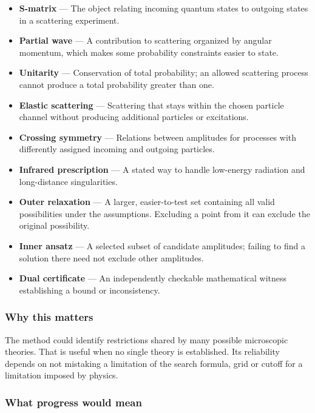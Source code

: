 \documentclass[
  11pt,
]{article}
\begin{document}
\begin{itemize}
\item
  \textbf{S-matrix} --- The object relating incoming quantum states to
  outgoing states in a scattering experiment.
\item
  \textbf{Partial wave} --- A contribution to scattering organized by
  angular momentum, which makes some probability constraints easier to
  state.
\item
  \textbf{Unitarity} --- Conservation of total probability; an allowed
  scattering process cannot produce a total probability greater than
  one.
\item
  \textbf{Elastic scattering} --- Scattering that stays within the
  chosen particle channel without producing additional particles or
  excitations.
\item
  \textbf{Crossing symmetry} --- Relations between amplitudes for
  processes with differently assigned incoming and outgoing particles.
\item
  \textbf{Infrared prescription} --- A stated way to handle low-energy
  radiation and long-distance singularities.
\item
  \textbf{Outer relaxation} --- A larger, easier-to-test set containing
  all valid possibilities under the assumptions. Excluding a point from
  it can exclude the original possibility.
\item
  \textbf{Inner ansatz} --- A selected subset of candidate amplitudes;
  failing to find a solution there need not exclude other amplitudes.
\item
  \textbf{Dual certificate} --- An independently checkable mathematical
  witness establishing a bound or inconsistency.
\end{itemize}

\subsubsection{Why this matters}

The method could identify restrictions shared by many possible
microscopic theories. That is useful when no single theory is
established. Its reliability depends on not mistaking a limitation of
the search formula, grid or cutoff for a limitation imposed by physics.

\subsubsection{What progress would mean}
\end{document}
